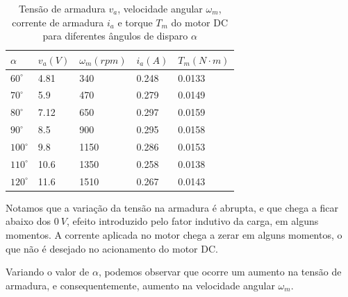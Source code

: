 \documentclass{article}
\begin{document}
\begin{table}[H]
	\centering
	\caption{Tensão de armadura $v_a$, velocidade angular $\omega_m$, corrente de armadura $i_a$ e torque $T_m$ do motor DC para diferentes ângulos de disparo $\alpha$}
	\label{tab:varet}
	\begin{tabular}{|l|l|l|l|l|}
		\hline
		$\alpha$    & $v_a (V)$ & $\omega_m (rpm)$ & $i_a  (A)$ & $T_m (N\cdot m)$ \\ \hline
		$60^\circ$  & 4.81      & 340              & 0.248         & 0.0133           \\ \hline
		$70^\circ$  & 5.9       & 470              & 0.279         & 0.0149           \\ \hline
		$80^\circ$  & 7.12      & 650              & 0.297         & 0.0159           \\ \hline
		$90^\circ$  & 8.5       & 900              & 0.295     & 0.0158     \\ \hline
		$100^\circ$ & 9.8       & 1150             & 0.286         & 0.0153           \\ \hline
		$110^\circ$ & 10.6      & 1350             & 0.258         & 0.0138           \\ \hline
		$120^\circ$ & 11.6      & 1510             & 0.267         & 0.0143           \\ \hline
	\end{tabular}
\end{table}

Notamos que a variação da tensão na armadura é abrupta, e que chega a ficar abaixo dos $0\ V$, efeito introduzido pelo fator indutivo da carga, em alguns momentos. A corrente aplicada no motor chega a zerar em alguns momentos, o que não é desejado no acionamento do motor DC.

Variando o valor de $\alpha$, podemos observar que ocorre um aumento na tensão de armadura, e consequentemente, aumento na velocidade angular $\omega_m$. 
\end{document}
